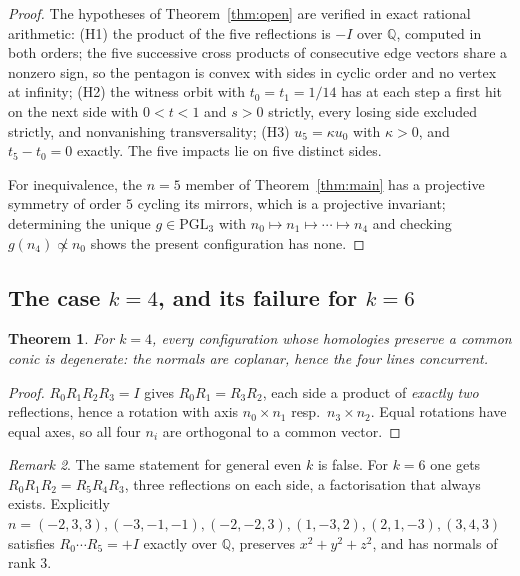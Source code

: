 \documentclass[11pt,a4paper]{article}
\theoremstyle{plain}
\newtheorem{theorem}{Theorem}[section]
\theoremstyle{definition}
\theoremstyle{remark}
\newtheorem{remark}[theorem]{Remark}
\newcommand{\PGL}{\mathrm{PGL}}
\begin{document}
\begin{proof}
The hypotheses of Theorem~\ref{thm:open} are verified in exact rational arithmetic:
(H1) the product of the five reflections is $-I$ over $\mathbb{Q}$, computed in
both orders; the five successive cross products of consecutive edge vectors share a
nonzero sign, so the pentagon is convex with sides in cyclic order and no vertex at
infinity; (H2) the witness orbit with $t_0=t_1=1/14$ has at each step a first hit on
the next side with $0<t<1$ and $s>0$ strictly, every losing side excluded strictly,
and nonvanishing transversality; (H3) $u_5=\kappa u_0$ with $\kappa>0$, and
$t_5-t_0=0$ exactly. The five impacts lie on five distinct sides.

For inequivalence, the $n=5$ member of Theorem~\ref{thm:main} has a projective
symmetry of order $5$ cycling its mirrors, which is a projective invariant;
determining the unique $g\in\PGL_3$ with $n_0\mapsto n_1\mapsto\cdots\mapsto n_4$
and checking $g(n_4)\not\propto n_0$ shows the present configuration has none.
\end{proof}

\subsection{The case $k=4$, and its failure for $k=6$}

\begin{theorem}\label{thm:k4}
For $k=4$, every configuration whose homologies preserve a common conic is
degenerate: the normals are coplanar, hence the four lines concurrent.
\end{theorem}

\begin{proof}
$R_0R_1R_2R_3=I$ gives $R_0R_1=R_3R_2$, each side a product of \emph{exactly two}
reflections, hence a rotation with axis $n_0\times n_1$ resp.\ $n_3\times n_2$.
Equal rotations have equal axes, so all four $n_i$ are orthogonal to a common
vector.
\end{proof}

\begin{remark}\label{rem:k6}
The same statement for general even $k$ is false. For $k=6$ one gets
$R_0R_1R_2=R_5R_4R_3$, three reflections on each side, a factorisation that always
exists. Explicitly $n=(-2,3,3),(-3,-1,-1),(-2,-2,3),(1,-3,2),(2,1,-3),(3,4,3)$
satisfies $R_0\cdots R_5=+I$ exactly over $\mathbb{Q}$, preserves $x^2+y^2+z^2$, and
has normals of rank $3$.
\end{remark}
\end{document}
